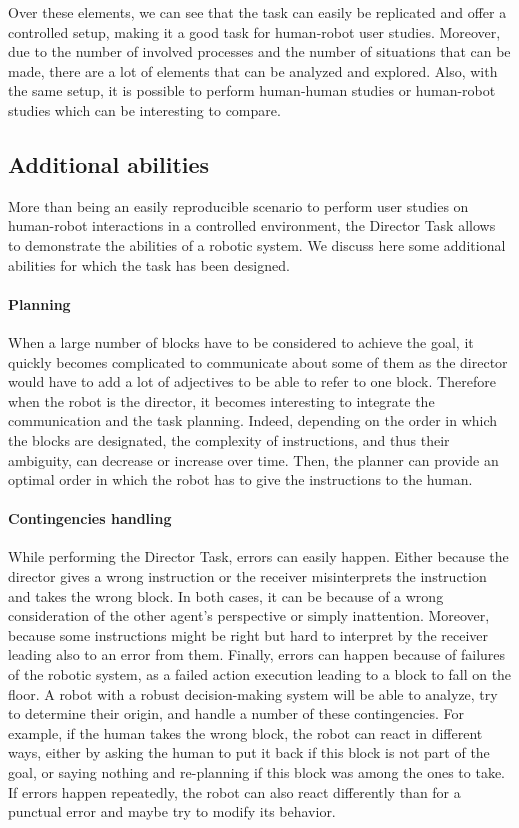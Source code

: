 Over these elements, we can see that the task can easily be replicated and offer a controlled setup, making it a good task for human-robot user studies. Moreover, due to the number of involved processes and the number of situations that can be made, there are a lot of elements that can be analyzed and explored. Also, with the same setup, it is possible to perform human-human studies or human-robot studies which can be interesting to compare.

\subsection{Additional abilities}

More than being an easily reproducible scenario to perform user studies on human-robot interactions in a controlled environment, the Director Task allows to demonstrate the abilities of a robotic system. We discuss here some additional abilities for which the task has been designed.

\paragraph{Planning} When a large number of blocks have to be considered to achieve the goal, it quickly becomes complicated to communicate about some of them as the director would have to add a lot of adjectives to be able to refer to one block. Therefore when the robot is the director, it becomes interesting to integrate the communication and the task planning. Indeed, depending on the order in which the blocks are designated, the complexity of instructions, and thus their ambiguity, can decrease or increase over time. Then, the planner can provide an optimal order in which the robot has to give the instructions to the human.

\paragraph{Contingencies handling} While performing the Director Task, errors can easily happen. Either because the director gives a wrong instruction or the receiver misinterprets the instruction and takes the wrong block. In both cases, it can be because of a wrong consideration of the other agent's perspective or simply inattention. Moreover, because some instructions might be right but hard to interpret by the receiver leading also to an error from them. Finally, errors can happen because of failures of the robotic system, as a failed action execution leading to a block to fall on the floor. A robot with a robust decision-making system will be able to analyze, try to determine their origin, and handle a number of these contingencies. For example, if the human takes the wrong block, the robot can react in different ways, either by asking the human to put it back if this block is not part of the goal, or saying nothing and re-planning if this block was among the ones to take. If errors happen repeatedly, the robot can also react differently than for a punctual error and maybe try to modify its behavior.

